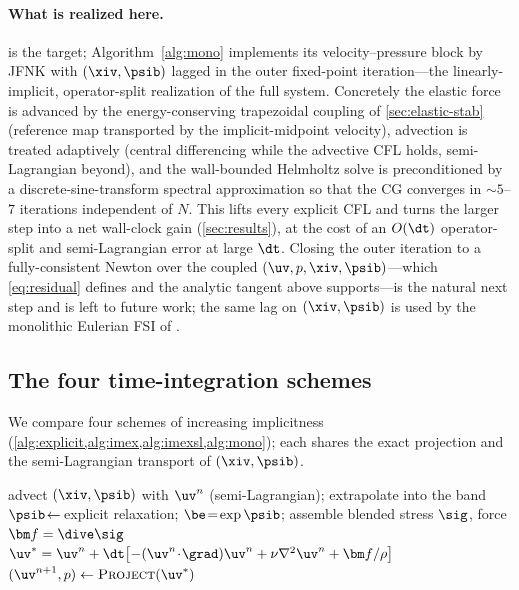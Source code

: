 \paragraph{What is realized here.}  is the target; Algorithm~\ref{alg:mono}
implements its velocity--pressure block by JFNK with $(\xiv,\psib)$ lagged in the outer
fixed-point iteration---the linearly-implicit, operator-split realization of the full
system. Concretely the elastic force is advanced by the energy-conserving trapezoidal
coupling of \cref{sec:elastic-stab} (reference map transported by the implicit-midpoint
velocity), advection is treated adaptively (central differencing while the advective CFL
holds, semi-Lagrangian beyond), and the wall-bounded Helmholtz solve is preconditioned by
a discrete-sine-transform spectral approximation so that the CG converges in ${\sim}5$--$7$
iterations independent of $N$. This lifts every explicit CFL and turns the larger step
into a net wall-clock gain (\cref{sec:results}), at the cost of an $O(\dt)$ operator-split
and semi-Lagrangian error at large $\dt$. Closing the outer iteration to a fully-consistent
Newton over the coupled $(\uv,p,\xiv,\psib)$---which \eqref{eq:residual} defines and the
analytic tangent above supports---is the natural next step and is left to future work; the
same lag on $(\xiv,\psib)$ is used by the monolithic Eulerian FSI of
\cite{Richter2013,Dunne2006}.

\subsection{The four time-integration schemes}
\label{sec:four-schemes}
We compare four schemes of increasing implicitness (\cref{alg:explicit,alg:imex,alg:imexsl,alg:mono});
each shares the exact projection and the semi-Lagrangian transport of $(\xiv,\psib)$.

\begin{algorithm}[t]\small\caption{\textsc{Explicit} --- one step}\label{alg:explicit}
\begin{algorithmic}[1]
\State advect $(\xiv,\psib)$ with $\uv^n$ (semi-Lagrangian); extrapolate into the band
\State $\psib\!\leftarrow\!$ explicit relaxation; $\be\!=\!\exp\psib$; assemble blended stress $\sig$, force $\bm f=\dive\sig$
\State $\uv^{*}=\uv^n+\dt\!\left[-(\uv^n\!\cdot\!\grad)\uv^n+\nu\nabla^2\uv^n+\bm f/\rho\right]$
\State $(\uv^{n+1},p)\leftarrow\textsc{Project}(\uv^{*})$
\end{algorithmic}
\end{algorithm}

